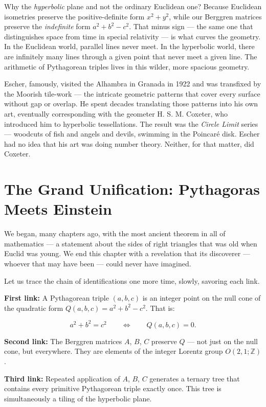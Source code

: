 \documentclass[11pt,twoside,openright]{book}
\theoremstyle{definition}
\theoremstyle{remark}
\begin{document}
Why the \textit{hyperbolic} plane and not the ordinary Euclidean one? Because Euclidean isometries preserve the positive-definite form $x^2 + y^2$, while our Berggren matrices preserve the \textit{indefinite} form $a^2 + b^2 - c^2$. That minus sign --- the same one that distinguishes space from time in special relativity --- is what curves the geometry. In the Euclidean world, parallel lines never meet. In the hyperbolic world, there are infinitely many lines through a given point that never meet a given line. The arithmetic of Pythagorean triples lives in this wilder, more spacious geometry.

Escher, famously, visited the Alhambra in Granada in 1922 and was transfixed by the Moorish tile-work --- the intricate geometric patterns that cover every surface without gap or overlap. He spent decades translating those patterns into his own art, eventually corresponding with the geometer H. S. M. Coxeter, who introduced him to hyperbolic tessellations. The result was the \textit{Circle Limit} series --- woodcuts of fish and angels and devils, swimming in the Poincar\'e disk. Escher had no idea that his art was doing number theory. Neither, for that matter, did Coxeter.



\section{The Grand Unification: Pythagoras Meets Einstein}

We began, many chapters ago, with the most ancient theorem in all of mathematics --- a statement about the sides of right triangles that was old when Euclid was young. We end this chapter with a revelation that its discoverer --- whoever that may have been --- could never have imagined.

Let us trace the chain of identifications one more time, slowly, savoring each link.

\textbf{First link:} A Pythagorean triple $(a, b, c)$ is an integer point on the null cone of the quadratic form $Q(a, b, c) = a^2 + b^2 - c^2$. That is:

\[a^2 + b^2 = c^2 \qquad\Longleftrightarrow\qquad Q(a, b, c) = 0.\]

\textbf{Second link:} The Berggren matrices $A$, $B$, $C$ preserve $Q$ --- not just on the null cone, but everywhere. They are elements of the integer Lorentz group $O(2,1; \mathbb{Z})$.

\textbf{Third link:} Repeated application of $A$, $B$, $C$ generates a ternary tree that contains every primitive Pythagorean triple exactly once. This tree is simultaneously a tiling of the hyperbolic plane.
\end{document}

